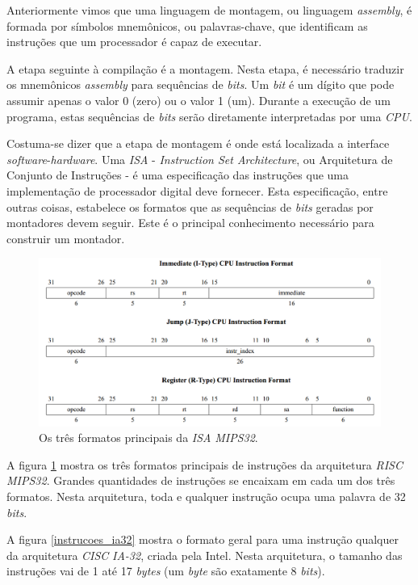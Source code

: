 Anteriormente vimos que uma linguagem de montagem, ou linguagem \textit{assembly}, é formada por símbolos mnemônicos, ou palavras-chave, que identificam as instruções que um processador é capaz de executar.

A etapa seguinte à compilação é a montagem. Nesta etapa, é necessário traduzir os mnemônicos \textit{assembly} para sequências de \textit{bits}. Um \textit{bit} é um dígito que pode assumir apenas o valor 0 (zero) ou o valor 1 (um). Durante a execução de um programa, estas sequências de \textit{bits} serão diretamente interpretadas por uma \textit{CPU}.

Costuma-se dizer que a etapa de montagem é onde está localizada a interface \textit{software}-\textit{hardware}. Uma \textit{ISA} - \textit{Instruction Set Architecture}, ou Arquitetura de Conjunto de Instruções - é uma especificação das instruções que uma implementação de processador digital deve fornecer. Esta especificação, entre outras coisas, estabelece os formatos que as sequências de \textit{bits} geradas por montadores devem seguir. Este é o principal conhecimento necessário para construir um montador.

\begin{figure}[ptb]
  \begin{center}
    \includegraphics[scale=.45]{imagens/instrucoes_mips}
  \end{center}
  \caption{Os três formatos principais da \textit{ISA} \textit{MIPS32}.}
  \label{instrucoes_mips}
\end{figure}

A figura \ref{instrucoes_mips} mostra os três formatos principais de instruções da arquitetura \textit{RISC} \textit{MIPS32}. Grandes quantidades de instruções se encaixam em cada um dos três formatos. Nesta arquitetura, toda e qualquer instrução ocupa uma palavra de 32 \textit{bits}.

A figura \ref{instrucoes_ia32} mostra o formato geral para uma instrução qualquer da arquitetura \textit{CISC} \textit{IA-32}, criada pela Intel. Nesta arquitetura, o tamanho das instruções vai de 1 até 17 \textit{bytes} (um \textit{byte} são exatamente 8 \textit{bits}).

